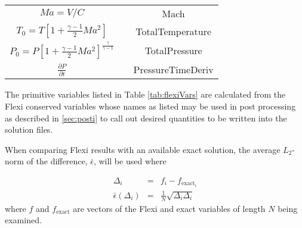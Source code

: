 \begin{table}[h!]
\begin{center}
\begin{tabular}{|c|c|c|}
   $ Ma = V/C$                                    &                                           & Mach \\
   $T_0 = T \left[ 1+\frac{\gamma - 1}{2} Ma^2 \right]$
                                                           &                                          & TotalTemperature \\
    $P_0 = P \left[1+\frac{\gamma-1}{2} Ma^2 \right]^{\frac{\gamma}{\gamma-1}} $
                                                           &                                          &TotalPressure \\
    $\frac{\partial P}{\partial t}$        &                                          & PressureTimeDeriv \\ \hline
  \end{tabular}
 \end{center}
\end{table}

\noindent The primitive variables listed in Table \ref{tab:flexiVars} are calculated from the Flexi conserved variables whose names as listed may be used in post processing as described in \ref{sec:posti} to call out desired quantities to be written into the solution files.

When comparing Flexi results with an available exact solution, the average $L_2$-norm of the difference, $\bar{\epsilon}$,  will be used where

\begin{eqnarray}\label{eq:error}
 \Delta_i & = & f_i - f_{{\mathrm{exact}}_i} \\
 \bar{\epsilon}(\Delta_i) & = & \frac{1}{N} \sqrt{ \Delta_i \Delta_i} \label{eq:avgerr}
\end{eqnarray}
\noindent where $f$ and $f_{\mathrm{exact}}$ are vectors of the Flexi and exact variables of length $N$ being examined.
